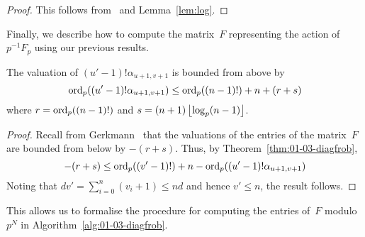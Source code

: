 \begin{proof}
This follows from~\citep[Section~6.2]{Lau04} and Lemma~\ref{lem:log}.
\end{proof}

Finally, we describe how to compute the matrix~$F$ representing 
the action of $p^{-1} F_p$ using our previous results.

\begin{prop}
The valuation of $(u'-1)! \alpha_{u+1,v+1}$ is bounded from above by 
\begin{equation*}
\operatorname{ord}_p((u'-1)! \alpha_{u+1,v+1}) \leq \operatorname{ord}_p((n-1)!) + n + (r + s)
\end{equation*}
where $r = \operatorname{ord}_p((n-1)!)$ and $s = (n+1) \left\lfloor\log_p(n-1)\right\rfloor$. 
\end{prop}

\begin{proof}
Recall from Gerkmann~\citep[Lemma~3.3]{Gerkmann2007} that the valuations 
of the entries of the matrix~$F$ are bounded from below by $-(r+s)$. 
Thus, by Theorem~\ref{thm:01-03-diagfrob}, 
\begin{equation*}
-(r+s) \leq \operatorname{ord}_p((v'-1)!) + n - \operatorname{ord}_p((u'-1)! \alpha_{u+1,v+1})
\end{equation*}
Noting that $d v' = \sum_{i=0}^n (v_i + 1) \leq n d$ and 
hence $v' \leq n$, the result follows.
\end{proof}

This allows us to formalise the procedure for computing the 
entries of~$F$ modulo~$p^N$ in Algorithm~\ref{alg:01-03-diagfrob}.

